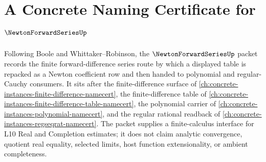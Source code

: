 \chapter{A Concrete Naming Certificate for $\NewtonForwardSeriesUp$}
\label{ch:concrete-instances-newton-forward-series-namecert}

Following Boole and Whittaker--Robinson, the $\NewtonForwardSeriesUp$ packet records the finite forward-difference series route by which a displayed table is repacked as a Newton coefficient row and then handed to polynomial and regular-Cauchy consumers. It sits after the finite-difference surface of \autoref{ch:concrete-instances-finite-difference-namecert}, the finite-difference table of \autoref{ch:concrete-instances-finite-difference-table-namecert}, the polynomial carrier of \autoref{ch:concrete-instances-polynomial-namecert}, and the regular rational readback of \autoref{ch:concrete-instances-regseqrat-namecert}. The packet supplies a finite-calculus interface for L10 Real and Completion estimates; it does not claim analytic convergence, quotient real equality, selected limits, host function extensionality, or ambient completeness.

